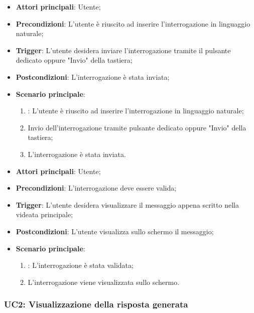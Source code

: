 \hypertarget{UC1.2}{}
\begin{itemize}
    \item \textbf{Attori principali}: Utente;
    \item \textbf{Precondizioni}: L'utente è riuscito ad inserire l'interrogazione in linguaggio naturale;
    \item \textbf{Trigger}: L'utente desidera inviare l'interrogazione tramite il pulsante dedicato oppure "Invio" della tastiera;
    \item \textbf{Postcondizioni}: L'interrogazione è stata inviata;
    \item \textbf{Scenario principale}:
    \begin{enumerate}
        \item {}: L'utente è riuscito ad inserire l'interrogazione in linguaggio naturale;
        \item Invio dell'interrogazione tramite pulsante dedicato oppure "Invio" della tastiera;
        \item L'interrogazione è stata inviata.
    \end{enumerate}
\end{itemize}

\hypertarget{UC1.3}{}
\begin{itemize}
    \item \textbf{Attori principali}: Utente;
    \item \textbf{Precondizioni}: L'interrogazione deve essere valida;
    \item \textbf{Trigger}: L'utente desidera visualizzare il messaggio appena scritto nella videata principale;
    \item \textbf{Postcondizioni}: L'utente visualizza sullo schermo il messaggio;
    \item \textbf{Scenario principale}:
    \begin{enumerate}
        \item {}: L'interrogazione è stata validata;
        \item L'interrogazione viene visualizzata sullo schermo.
    \end{enumerate}
\end{itemize}


\hypertarget{UC2}{}
\subsubsection{UC2: Visualizzazione della risposta generata}

